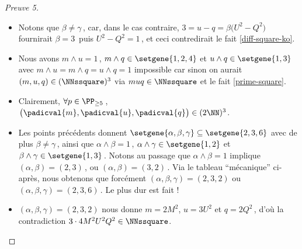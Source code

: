 \begin{proof}[Preuve 5]
\begin{itemize}
		\item Notons que $\beta \neq \gamma$\,, car, dans le cas contraire, $3 = u - q = \beta \big( U^2 - Q^2 \big)$ fournirait $\beta = 3$\, puis $U^2 - Q^2 = 1$\,, et ceci contredirait le fait \ref{diff-square-ko}.


		\item Nous avons $m \wedge u = 1$\,, $m \wedge q \in \setgene{1, 2, 4}$ et $u \wedge q \in \setgene{1, 3}$
		avec $m \wedge u = m \wedge q = u \wedge q = 1$ impossible car sinon on aurait $(m, u, q) \in ( \NNssquare )^3$ via $muq \in \NNssquare$ et le fait \ref{prime-square}.


		\item Clairement, $\forall p \in \PP_{\geq 5}$\,, $\big( \padicval{m} , \padicval{u} , \padicval{q} \big) \in ( 2 \NN )^3$.


		\item Les points précédents donnent 
		$\setgene{\alpha, \beta, \gamma} \subseteq \setgene{2, 3, 6}$
		avec de plus
		$\beta \neq \gamma$\,,
		ainsi que 
		$\alpha \wedge \beta = 1$\,, $\alpha \wedge \gamma \in \setgene{1, 2}$ et $\beta \wedge \gamma \in \setgene{1, 3}$\,.
		Notons au passage que $\alpha \wedge \beta = 1$ implique $(\alpha, \beta) = (2, 3)$\,, ou $(\alpha, \beta) = (3, 2)$\,.
		Via le tableau \enquote{mécanique} ci-après, nous obtenons que forcément $(\alpha, \beta, \gamma) = (2, 3, 2)$ ou $(\alpha, \beta, \gamma) = (2, 3, 6)$\,. Le plus dur est fait !
	\end{itemize}

	\begin{center}
	\end{center}


	\begin{itemize}
		\item $(\alpha, \beta, \gamma) = (2, 3, 2)$ nous donne $m = 2 M^2$, $u = 3 U^2$ et $q = 2 Q^2$\,, d'où la contradiction $3 \cdot4 M^2 U^2 Q^2 \in \NNssquare$.



\end{itemize}
\end{proof}

